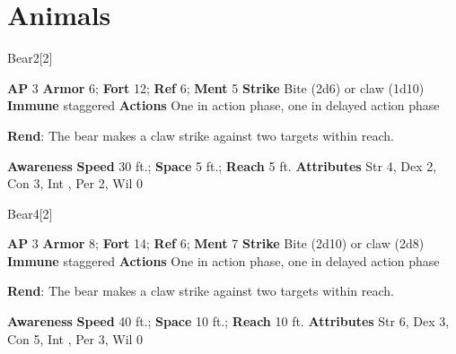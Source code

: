\section{Animals}
\begin{monsection}[Black]{Bear}{2}[2]
\vspace{-1em}\vspace{-1em}
\begin{spellcontent}
\begin{spelltargetinginfo}
{\textbf{AP} 3}
\pari \textbf{Armor} 6;
\textbf{Fort} 12;
\textbf{Ref} 6;
\textbf{Ment} 5
\pari \textbf{Strike} Bite  (2d6) or claw  (1d10)
\pari \textbf{Immune} staggered
\pari \textbf{Actions} One in action phase, one in delayed action phase
\end{spelltargetinginfo}
\begin{spelleffects}
\pari
\textbf{Rend}:
The bear makes a claw strike against two targets within reach.
\end{spelleffects}
\end{spellcontent}
\begin{spellsubcontent}
\begin{spellfooter}
\pari \textbf{Awareness} 
\pari \textbf{Speed} 30 ft.;
\textbf{Space} 5 ft.;
\textbf{Reach} 5 ft.
\pari \textbf{Attributes}
Str 4,
Dex 2,
Con 3,
Int ,
Per 2,
Wil 0
\end{spellfooter}
\end{spellsubcontent}
\end{monsection}
\begin{monsection}[Brown]{Bear}{4}[2]
\vspace{-1em}\vspace{-1em}
\begin{spellcontent}
\begin{spelltargetinginfo}
{\textbf{AP} 3}
\pari \textbf{Armor} 8;
\textbf{Fort} 14;
\textbf{Ref} 6;
\textbf{Ment} 7
\pari \textbf{Strike} Bite  (2d10) or claw  (2d8)
\pari \textbf{Immune} staggered
\pari \textbf{Actions} One in action phase, one in delayed action phase
\end{spelltargetinginfo}
\begin{spelleffects}
\pari
\textbf{Rend}:
The bear makes a claw strike against two targets within reach.
\end{spelleffects}
\end{spellcontent}
\begin{spellsubcontent}
\begin{spellfooter}
\pari \textbf{Awareness} 
\pari \textbf{Speed} 40 ft.;
\textbf{Space} 10 ft.;
\textbf{Reach} 10 ft.
\pari \textbf{Attributes}
Str 6,
Dex 3,
Con 5,
Int ,
Per 3,
Wil 0
\end{spellfooter}
\end{spellsubcontent}
\end{monsection}
